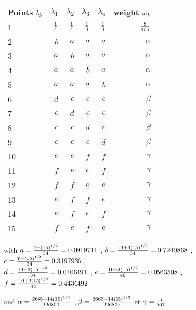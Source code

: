 \begin {center}
\begin{tabular}{|l|r|r|r|r|r|}
\hline
Points $b_k$    & $\lambda_1$   & $\lambda_2$   & $\lambda_3$  & $\lambda_4$  & weight $\omega_k$   \\
 \hline         
1   & ${ 1 \over 4 }$ & ${ 1 \over 4 }$ & ${1 \over 4 }$ & ${ 1 \over 4 }$ & ${ 8 \over 405} $  \\
 \hline  
2   & $b$    & $a$     & $a$    & $a$    & $\alpha$   \\\hline           
3   & $a$    & $b$     & $a$    & $a$    & $\alpha$   \\\hline
4   & $a$    & $a$     & $b$    & $a$    & $\alpha$   \\\hline           
5   & $a$    & $a$     & $a$    & $b$    & $\alpha$   \\\hline           
6   & $d$    & $c$     & $c$    & $c$    & $\beta$    \\\hline           
7   & $c$    & $d$     & $c$    & $c$    & $\beta$    \\\hline           
8   & $c$    & $c$     & $d$   &  $c$    & $\beta$    \\\hline           
9   & $c$    & $c$     & $c$   &  $d$    & $\beta$    \\\hline           
10      & $e$    & $e$     & $f$   &  $f$    & $\gamma$  \\\hline
11      & $f$    & $e$     & $e$   &  $f$    & $\gamma$  \\\hline          
12      & $f$    & $f$     & $e$   &  $e$    & $\gamma$  \\\hline           
13      & $e$    & $f$     & $f$   &  $e$    & $\gamma$  \\\hline           
14      & $e$    & $f$     & $e$   &  $f$    & $\gamma$  \\\hline           
15      & $f$    & $e$     & $f$   &  $e$    & $\gamma$  \\\hline           
\end{tabular}\end{center}


with $a =  { {7 - \sqrt{15}} \over 34 } = 0.0919711 $ , $ b =  { {13 + 3 \sqrt{15}} \over 34 } = 0.7240868 $ , 
 $c =  { {7 + \sqrt{15}} \over 34 } = 0.3197936 $ , \\ $ d =  { {13 - 3 \sqrt{15}} \over 34 } = 0.0406191 $ , 
 $e =  { {10 - 2 \sqrt{15}} \over 40 } = 0.0563508 $ , $ f =  { {10 + 2 \sqrt{15}} \over 40 } = 0.4436492 $

and  $\alpha = { {2665 + 14 \sqrt{15}} \over 226800 }$ , $ \beta = { {2665 - 14 \sqrt{15}} \over 226800 }$
 et   $\gamma = { 5 \over 567 } $

